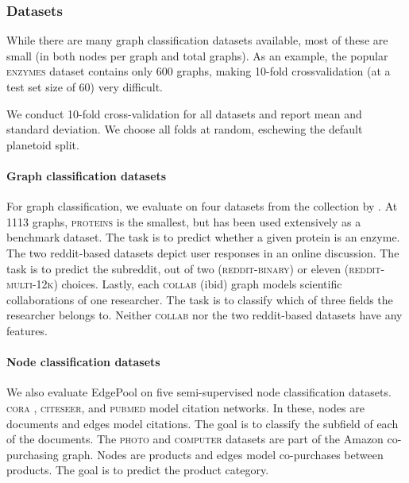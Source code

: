 \documentclass{article}
\newcommand{\edgepool}{EdgePool}
\newcommand{\datasetname}[1]{\textsc{#1}}
\newcommand{\enzymes}{\datasetname{enzymes}}
\newcommand{\proteins}{\datasetname{proteins}}
\newcommand{\redditbinary}{\datasetname{reddit-binary}}
\newcommand{\reddittwelve}{\datasetname{reddit-multi-12k}}
\newcommand{\collab}{\datasetname{collab}}
\newcommand{\cora}{\datasetname{cora}}
\newcommand{\citeseer}{\datasetname{citeseer}}
\newcommand{\pubmed}{\datasetname{pubmed}}
\newcommand{\photo}{\datasetname{photo}}
\newcommand{\computer}{\datasetname{computer}}
\begin{document}
\subsubsection{Datasets}

While there are many graph classification datasets available, most of these are small (in both nodes per graph and total graphs). As an example, the popular \enzymes{} dataset contains only 600 graphs, making 10-fold crossvalidation (at a test set size of 60) very difficult.

We conduct 10-fold cross-validation for all datasets and report mean and standard deviation. We choose all folds at random, eschewing the default planetoid split.

\paragraph{Graph classification datasets}

For graph classification, we evaluate on four datasets from the collection by \citet{KKMMN2016}. At 1113 graphs, \proteins{} \citep{borgwardtProteinFunctionPrediction2005} is the smallest, but has been used extensively as a benchmark dataset. The task is to predict whether a given protein is an enzyme. The two reddit-based datasets \citep{yanardagDeepGraphKernels2015} depict user responses in an online discussion. The task is to predict the subreddit, out of two (\redditbinary{}) or eleven (\reddittwelve{}) choices. Lastly, each \collab{} (ibid) graph models scientific collaborations of one researcher. The task is to classify which of three fields the researcher belongs to. Neither \collab{} nor the two reddit-based datasets have any features.

\paragraph{Node classification datasets}
We also evaluate \edgepool{} on five semi-supervised node classification datasets. \cora{} \citep{namataQuerydrivenActiveSurveying2012}, \citeseer{}, and \pubmed{} \citep{senCollectiveClassificationNetwork2008} model citation networks. In these, nodes are documents and edges model citations. The goal is to classify the subfield of each of the documents. The \photo{} and \computer{} datasets \citep{shchurPitfallsGraphNeural2018} are part of the Amazon co-purchasing graph. Nodes are products and edges model co-purchases between products. The goal is to predict the product category.
\end{document}
